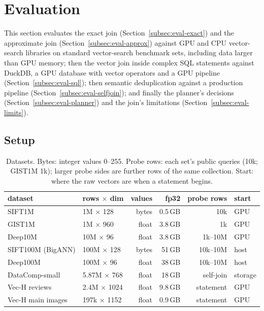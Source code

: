 \section{Evaluation}\label{sec:evaluation}
\providecommand{\pending}[1]{\textcolor{red}{[#1]}}


This section evaluates the exact join (Section~\ref{subsec:eval-exact}) and the approximate join (Section~\ref{subsec:eval-approx}) against GPU and CPU vector-search libraries on standard vector-search benchmark sets, including data larger than GPU memory; then the vector join inside complex SQL statements against DuckDB, a GPU database with vector operators and a GPU pipeline (Section~\ref{subsec:eval-sql}); then semantic deduplication against a production pipeline (Section~\ref{subsec:eval-selfjoin}); and finally the planner's decisions (Section~\ref{subsec:eval-planner}) and the join's limitations (Section~\ref{subsec:eval-limits}).

\subsection{Setup}\label{subsec:eval-setup}

\begin{table}[t]
    \centering\scriptsize
    \setlength{\tabcolsep}{2.5pt}
    \begin{tabular}{@{}llrrrl@{}}
        \toprule
        dataset & rows $\times$ dim & values & fp32 & probe rows & start \\
        \midrule
        SIFT1M & 1M $\times$ 128 & bytes & 0.5\,GB & 10k & GPU \\
        GIST1M & 1M $\times$ 960 & float & 3.8\,GB & 1k & GPU \\
        Deep10M & 10M $\times$ 96 & float & 3.8\,GB & 1k--10M & GPU \\
        SIFT100M (BigANN) & 100M $\times$ 128 & bytes & 51\,GB & 10k--10M & host \\
        Deep100M & 100M $\times$ 96 & float & 38\,GB & 10k--10M & host \\
        DataComp-small & 5.87M $\times$ 768 & float & 18\,GB & self-join & storage \\
        Vec-H reviews & 2.4M $\times$ 1024 & float & 9.8\,GB & statement & GPU \\
        Vec-H main images & 197k $\times$ 1152 & float & 0.9\,GB & statement & GPU \\
        \bottomrule
    \end{tabular}
    \caption{Datasets. Bytes: integer values 0--255. Probe rows: each set's public queries (10k; GIST1M 1k); larger probe sides are further rows of the same collection. Start: where the raw vectors are when a statement begins.}
    \label{tab:datasets}
\end{table}

